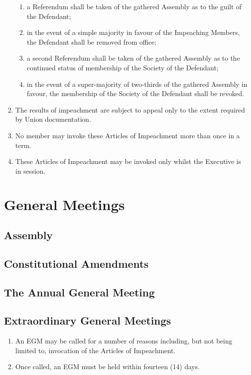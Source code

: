 \documentclass{scrartcl}
\begin{document}
\begin{enumerate}
\begin{enumerate}
                        \item a Referendum shall be taken of the gathered Assembly as to the guilt of the Defendant;
                        \item in the event of a simple majority in favour of the Impeaching Members, the Defendant shall be removed from office;
                        \item a second Referendum shall be taken of the gathered Assembly as to the continued status of membership of the Society of the Defendant;
                        \item in the event of a super-majority of two-thirds of the gathered Assembly in favour, the membership of the Society of the Defendant shall be revoked.
                    \end{enumerate}
                \item The results of impeachment are subject to appeal only to the extent required by Union documentation.
                \item No member may invoke these Articles of Impeachment more than once in a term.
                \item These Articles of Impeachment may be invoked only whilst the Executive is in session.
            \end{enumerate}

    \clearpage
    \section{General Meetings}
        \label{gm}
        \subsection{Assembly}
            \label{gm--assembly}

        \subsection{Constitutional Amendments}
            \label{gm--consitutional-amendment}

        \subsection{The Annual General Meeting}
            \label{gm--agm}

        \subsection{Extraordinary General Meetings}
            \label{gm--egm}
            \begin{enumerate}
                \item An EGM may be called for a number of reasons including, but not being limited to, invocation of the Articles of Impeachment.
                \item Once called, an EGM must be held within fourteen (14) days.
            \end{enumerate}
\end{document}
